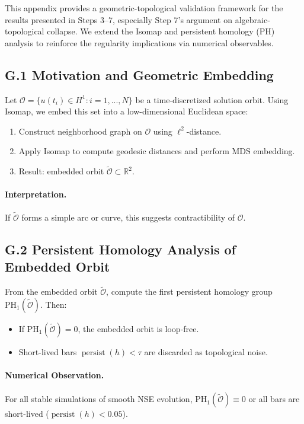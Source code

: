 \documentclass[11pt]{article}
\theoremstyle{definition}
\begin{document}
This appendix provides a geometric-topological validation framework for the results presented in Steps 3--7, especially Step 7's argument on algebraic-topological collapse. We extend the Isomap and persistent homology (PH) analysis to reinforce the regularity implications via numerical observables.

\subsection*{G.1 Motivation and Geometric Embedding}
Let $\mathcal{O} = \{u(t_i) \in H^1 : i=1,...,N\}$ be a time-discretized solution orbit. Using Isomap, we embed this set into a low-dimensional Euclidean space:

\begin{enumerate}
    \item Construct neighborhood graph on $\mathcal{O}$ using $\ell^2$-distance.
    \item Apply Isomap to compute geodesic distances and perform MDS embedding.
    \item Result: embedded orbit $\tilde{\mathcal{O}} \subset \mathbb{R}^2$.
\end{enumerate}

\paragraph{Interpretation.} If $\tilde{\mathcal{O}}$ forms a simple arc or curve, this suggests contractibility of $\mathcal{O}$.

\subsection*{G.2 Persistent Homology Analysis of Embedded Orbit}
From the embedded orbit $\tilde{\mathcal{O}}$, compute the first persistent homology group $\mathrm{PH}_1(\tilde{\mathcal{O}})$. Then:
\begin{itemize}
    \item If $\mathrm{PH}_1(\tilde{\mathcal{O}}) = 0$, the embedded orbit is loop-free.
    \item Short-lived bars $\operatorname{persist}(h) < \tau$ are discarded as topological noise.
\end{itemize}

\paragraph{Numerical Observation.} For all stable simulations of smooth NSE evolution, $\mathrm{PH}_1(\tilde{\mathcal{O}}) \equiv 0$ or all bars are short-lived ($\operatorname{persist}(h) < 0.05$).
\end{document}
